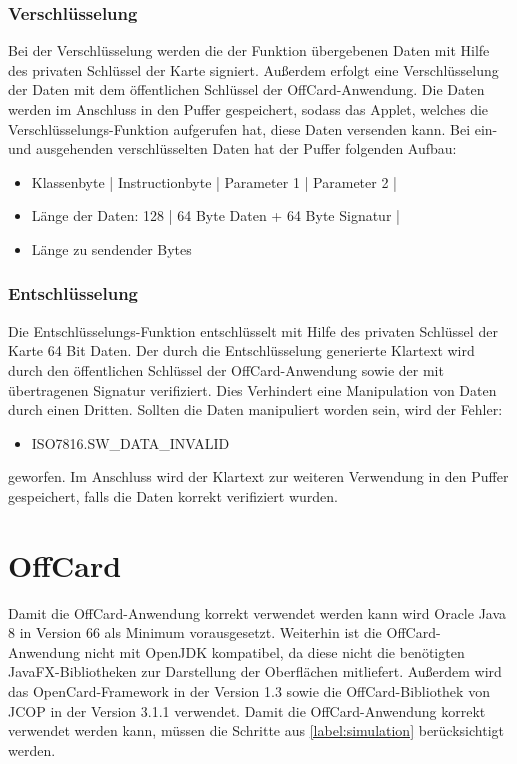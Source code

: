 \subsubsection{Verschlüsselung}
Bei der Verschlüsselung werden die der Funktion übergebenen Daten mit Hilfe des privaten Schlüssel der Karte signiert.
Außerdem erfolgt eine Verschlüsselung der Daten mit dem öffentlichen Schlüssel der OffCard-Anwendung.
Die Daten werden im Anschluss in den Puffer gespeichert, sodass das Applet, welches die Verschlüsselungs-Funktion aufgerufen hat, diese Daten versenden kann.
Bei ein- und ausgehenden verschlüsselten Daten hat der Puffer folgenden Aufbau:
\begin{itemize}
	\item[] Klassenbyte | Instructionbyte | Parameter 1 | Parameter 2 |
	\item[] Länge der Daten: 128 | 64 Byte Daten + 64 Byte Signatur | 
	\item[] Länge zu sendender Bytes
\end{itemize}

\subsubsection{Entschlüsselung}
Die Entschlüsselungs-Funktion entschlüsselt mit Hilfe des privaten Schlüssel der Karte 64 Bit Daten.
Der durch die Entschlüsselung generierte Klartext wird durch den öffentlichen Schlüssel der OffCard-Anwendung sowie der mit übertragenen Signatur verifiziert.
Dies Verhindert eine Manipulation von Daten durch einen Dritten.
Sollten die Daten manipuliert worden sein, wird der Fehler:
\begin{itemize}
	\item ISO7816.SW\_DATA\_INVALID
\end{itemize}
geworfen. 
Im Anschluss wird der Klartext zur weiteren Verwendung in den Puffer gespeichert, falls die Daten korrekt verifiziert wurden.

\section{OffCard}

Damit die OffCard-Anwendung korrekt verwendet werden kann wird Oracle Java 8 in Version 66 als Minimum vorausgesetzt.
Weiterhin ist die OffCard-Anwendung nicht mit OpenJDK kompatibel, da diese nicht die benötigten JavaFX-Bibliotheken zur Darstellung der Oberflächen mitliefert.
Außerdem wird das OpenCard-Framework in der Version 1.3 sowie die OffCard-Bibliothek von JCOP in der Version 3.1.1 verwendet.
Damit die OffCard-Anwendung korrekt verwendet werden kann, müssen die Schritte aus \autoref{label:simulation} berücksichtigt werden.

